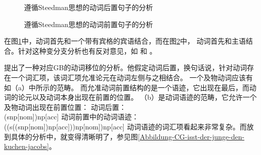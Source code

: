 \begin{figure}
\centerline{%
}
\caption{\label{Abbildung-CG-der-Mann-der-Frau-das-Buch-gibt}遵循Steedman思想的动词后置句子的分析}
\end{figure}%
\begin{figure}
\centerline{%
}
\caption{\label{Abbildung-CG-gibt-der-Mann-der-Frau-das-Buch}遵循Steedman思想的动词前置句子的分析}
\end{figure}%
在图\ref{Abbildung-CG-der-Mann-der-Frau-das-Buch-gibt}中，动词首先和一个带有宾格的宾语结合，而在图\ref{Abbildung-CG-gibt-der-Mann-der-Frau-das-Buch}中，
动词首先和主语结合。针对这种变分支分析也有反对意见，如 和 。

 \citet{Jacobs91a}提出了一种对应GB\indexgbc 的动词移位的分析。他假定动词后置，换句话说，针对动词存在一个词汇项，该词汇项允准论元在动词左侧与之相结合。
一个及物动词应该有如（a）中所示的范畴。
而允准动词前置结构的是一个语迹，它出现在最后，而动词的论元以及动词本身出现在前置的位置。
（b）是动词语迹的范畴，它允许一个及物动词出现在前置位置：
\eal
\ex 动词后置：\\
    (s\bs np[nom])\bs np[acc]
\ex 动词前置中的动词语迹：\\
    ((s\bs ((s\bs np[nom])\bs np[acc]))\bs np[nom])\bs np[acc]
\zl
动词语迹的词汇项看起来非常复杂。而放到具体的分析中，就变得清晰明了，参见图\vref{Abbildung-CG-isst-der-junge-den-kuchen-jacobs}。

